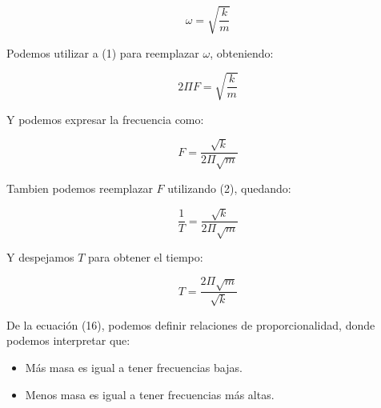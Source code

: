 \documentclass{article}
\begin{document}
\begin{equation}
    \omega = \sqrt{\frac{k}{m}}
\end{equation}

Podemos utilizar a (1) para reemplazar $\omega$, obteniendo:

\begin{equation}
    2\Pi F = \sqrt{\frac{k}{m}}
\end{equation}

Y podemos expresar la frecuencia como:

\begin{equation}
    F = \frac{\sqrt{k}}{2\Pi \sqrt{m}}
\end{equation}

Tambien podemos reemplazar $F$ utilizando (2), quedando:

\begin{equation}
    \frac{1}{T} = \frac{\sqrt{k}}{2\Pi \sqrt{m}}
\end{equation}

Y despejamos $T$ para obtener el tiempo:

\begin{equation}
    T = \frac{2\Pi \sqrt{m}}{\sqrt{k}}
\end{equation}

De la ecuación (16), podemos definir relaciones de proporcionalidad, donde podemos interpretar que:

\begin{itemize}
    \item Más masa es igual a tener frecuencias bajas.
    \item Menos masa es igual a tener frecuencias más altas.
\end{itemize}
\end{document}
